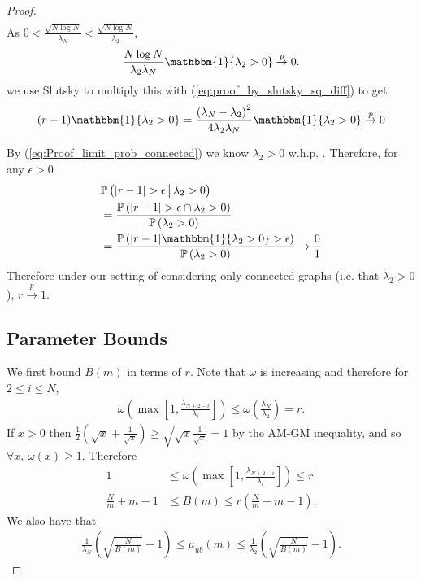 \begin{proof}
\begin{align}
\end{align}
As $0 < \frac{\sqrt{N\log N}}{ \lambda_{N}} < \frac{\sqrt{N\log N}}{ \lambda_{2}}$,
\begin{align}
    \frac{{N\log N}}{ \lambda_{2} \lambda_{N}} \mathbbm{1}\{ \lambda_{2} > 0 \} \overset{p}{\to} 0.
\end{align}
we use Slutsky to multiply this with (\ref{eq:proof_by_slutsky_sq_diff}) to get
\begin{align}
    (r-1)\mathbbm{1}\{ \lambda_{2} > 0 \} =  \frac{\left(\lambda_{N} - \lambda_{2}\right)^{2}}{ 4\lambda_{2} \lambda_{N}} \mathbbm{1}\{ \lambda_{2} > 0 \} \overset{p}{\to} 0
\end{align}

By (\ref{eq:Proof_limit_prob_connected}) we know $\lambda_{2} > 0$ w.h.p. . Therefore, for any $\epsilon > 0$
\begin{align}
    &\mathbb{P}\left( \lvert r-1 \rvert > \epsilon \,\big\vert\, \lambda_{2}  > 0 \right)  \\&= \frac{\mathbb{P}\left( \lvert r-1 \rvert> \epsilon \cap \lambda_{2}  > 0 \right)}{\mathbb{P}\left( \lambda_{2}  > 0 \right)} \\
    &= \frac{\mathbb{P}\left( \lvert r-1 \rvert \mathbbm{1}\{\lambda_{2}  > 0\} > \epsilon \right)}{\mathbb{P}\left( \lambda_{2}  > 0 \right)} \to \frac{0}{1}
\end{align}
Therefore under our setting of considering only connected graphs (i.e. that $\lambda_{2} > 0$), $r \overset{p}{\to} 1$.

\subsection{Parameter Bounds}
We first bound $B(m)$ in terms of $r$. Note that $\omega$ is increasing and therefore for $2 \leq i \leq N$,
\begin{align}
   \omega\left(\max\left[1,\frac{\lambda_{N+2-i}}{\lambda_{i}}\right]\right) \leq \omega\left(\frac{\lambda_{N}}{\lambda_{2}}\right) = r.
\end{align}
If $x > 0$ then $ \frac{1}{2}\left(\sqrt{x} + \frac{1}{\sqrt{x}}\right) \geq \sqrt{\sqrt{x}\frac{1}{\sqrt{x}}} = 1$ by the AM-GM inequality, and so $\forall x, \, \omega(x) \geq 1$. Therefore
\begin{align}
    1 &\leq \omega\left(\max\left[1,\frac{\lambda_{N+2-i}}{\lambda_{i}}\right]\right) \leq r \\
    \frac{N}{m} + m - 1 &\leq B(m) \leq r\left(\frac{N}{m} + m - 1\right).
\end{align}
We also have that
\begin{align}
   \frac{1}{\lambda_{N}} \left( \sqrt{\frac{N}{B(m)}}-1 \right) \leq \mu_{ub}\left(m\right) \leq \frac{1}{\lambda_{2}} \left( \sqrt{\frac{N}{B(m)}}-1 \right).
\end{align}


\end{proof}
